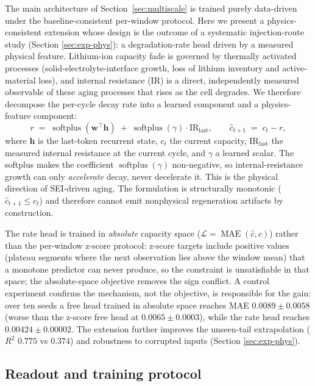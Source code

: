 \documentclass[final,5p,times,twocolumn]{elsarticle}
\begin{document}
The main architecture of Section~\ref{sec:multiscale} is trained
purely data-driven under the baseline-consistent per-window protocol.
Here we present a physics-consistent extension whose design is the
outcome of a systematic injection-route study (Section
\ref{sec:exp-phys}): a degradation-rate head driven by a measured
physical feature. Lithium-ion capacity fade is governed by
thermally activated processes (solid-electrolyte-interface growth,
loss of lithium inventory and active-material loss), and internal
resistance (IR) is a direct, independently measured observable of
these aging processes that rises as the cell degrades. We therefore
decompose the per-cycle decay rate into a learned component and a
physics-feature component:
\begin{equation}
\label{eq:rate_head}
r \;=\; \operatorname{softplus}(\mathbf{w}^{\top}\mathbf{h})
\;+\; \operatorname{softplus}(\gamma)\cdot \mathrm{IR}_{\text{last}},
\qquad
\hat{c}_{t+1} \;=\; c_t - r,
\end{equation}
where $\mathbf{h}$ is the last-token recurrent state, $c_t$ the current
capacity, $\mathrm{IR}_{\text{last}}$ the measured internal
resistance at the current cycle, and $\gamma$ a learned scalar. The
softplus makes the coefficient $\operatorname{softplus}(\gamma)$
non-negative, so internal-resistance growth can only \emph{accelerate}
decay, never decelerate it. This is the physical direction of SEI-driven
aging. The formulation is structurally monotonic
($\hat{c}_{t+1} \le c_t$) and therefore cannot emit nonphysical
regeneration artifacts by construction.

The rate head is trained in \emph{absolute} capacity space
($\mathcal{L} = \operatorname{MAE}(\hat{c}, c)$) rather than the
per-window z-score protocol: z-score targets include positive values
(plateau segments where the next observation lies above the window
mean) that a monotone predictor can never produce, so the constraint
is unsatisfiable in that space; the absolute-space objective removes
the sign conflict. A control experiment confirms the mechanism, not
the objective, is responsible for the gain: over ten seeds a free head
trained in absolute space reaches MAE $0.0089\pm0.0058$ (worse than
the z-score free head at $0.0065\pm0.0003$), while the rate head
reaches $0.00424\pm0.00002$. The extension
further improves the unseen-tail extrapolation ($R^2$ $0.775$ vs
$0.374$) and robustness to corrupted inputs (Section
\ref{sec:exp-phys}).

\subsection{Readout and training protocol}
\label{sec:readout}
\end{document}
